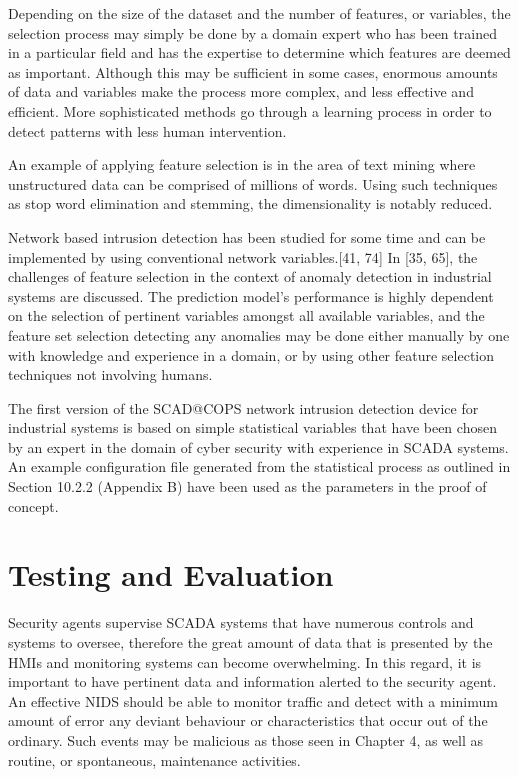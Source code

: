 \documentclass[11pt,]{article}
\begin{document}
Depending on the size of the dataset and the number of features, or
variables, the selection process may simply be done by a domain expert
who has been trained in a particular field and has the expertise to
determine which features are deemed as important. Although this may be
sufficient in some cases, enormous amounts of data and variables make
the process more complex, and less effective and efficient. More
sophisticated methods go through a learning process in order to detect
patterns with less human intervention.

An example of applying feature selection is in the area of text mining
where unstructured data can be comprised of millions of words. Using
such techniques as stop word elimination and stemming, the
dimensionality is notably reduced.

Network based intrusion detection has been studied for some time and can
be implemented by using conventional network variables.{[}41, 74{]} In
{[}35, 65{]}, the challenges of feature selection in the context of
anomaly detection in industrial systems are discussed. The prediction
model's performance is highly dependent on the selection of pertinent
variables amongst all available variables, and the feature set selection
detecting any anomalies may be done either manually by one with
knowledge and experience in a domain, or by using other feature
selection techniques not involving humans.

The first version of the SCAD@COPS network intrusion detection device
for industrial systems is based on simple statistical variables that
have been chosen by an expert in the domain of cyber security with
experience in SCADA systems. An example configuration file generated
from the statistical process as outlined in Section 10.2.2 (Appendix B)
have been used as the parameters in the proof of concept.

\newpage

\section{Testing and Evaluation}\label{testing-and-evaluation}

Security agents supervise SCADA systems that have numerous controls and
systems to oversee, therefore the great amount of data that is presented
by the HMIs and monitoring systems can become overwhelming. In this
regard, it is important to have pertinent data and information alerted
to the security agent. An effective NIDS should be able to monitor
traffic and detect with a minimum amount of error any deviant behaviour
or characteristics that occur out of the ordinary. Such events may be
malicious as those seen in Chapter 4, as well as routine, or
spontaneous, maintenance activities.
\end{document}
